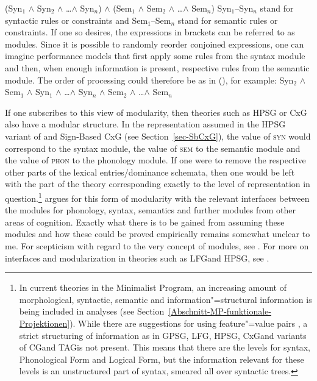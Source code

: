 \ea
(Syn$_1$ $\wedge$ Syn$_2$ $\wedge$ \ldots $\wedge$ Syn$_n$) $\wedge$ (Sem$_1$ $\wedge$ Sem$_2$ $\wedge$ \ldots $\wedge$ Sem$_n$)
\z
Syn$_1$--Syn$_n$ stand for syntactic rules or constraints and Sem$_1$--Sem$_n$ stand for semantic rules or constraints.
If one so desires, the expressions in brackets can be referred to as modules. Since it is possible
to randomly reorder conjoined expressions, one can imagine performance models that first apply some
rules from the syntax module and then, when enough information is present, respective rules from the
semantic module. The order of processing could therefore be as in (), for example: 
\ea
Syn$_2$ $\wedge$ Sem$_1$ $\wedge$ Syn$_1$ $\wedge$ \ldots $\wedge$ Syn$_n$ $\wedge$ Sem$_2$ $\wedge$ \ldots $\wedge$ Sem$_n$
\z

\noindent
If one subscribes to this view of modularity, then theories such as HPSG or CxG also have a modular structure.
In the representation assumed in the HPSG variant of \citet{ps} and Sign-Based CxG (see Section~\ref{sec-SbCxG}),
the value of \textsc{syn} would correspond to the syntax module, the value of \textsc{sem} to the semantic module and the value of \textsc{phon}  to the phonology module. If one were to
remove the respective other parts of the lexical entries/dominance schemata, then one would
 be left with the part of the theory corresponding exactly to the level of representation in question.\footnote{
  In current theories in the Minimalist Program, an increasing amount of morphological, syntactic, semantic and 
  information"=structural information is being included in analyses (see Section~\ref{Abschnitt-MP-funktionale-Projektionen}).
  While there are suggestions for using feature"=value pairs \citep[--291]{SE2002a}, a strict structuring of information
  as in GPSG\indexgpsg, LFG\indexlfg, HPSG\indexhpsg, CxG\indexcxg and variants of
  CG\indexcg and TAG\indextag is not present. This means that there are the levels for syntax, Phonological Form and Logical Form,
  but the information relevant for these levels is an unstructured part of syntax, smeared all over
  syntactic trees.
} 
  argues for this form of modularity with the relevant interfaces between the modules for phonology, syntax, semantics and further modules from other areas of cognition. 
Exactly what there is to be gained from assuming these modules and how these could be proved empirically remains somewhat unclear to me. For scepticism with regard to the very concept of modules, see
. For more on interfaces and modularization in theories such as LFG\indexlfg and HPSG\indexhpsg, see .

